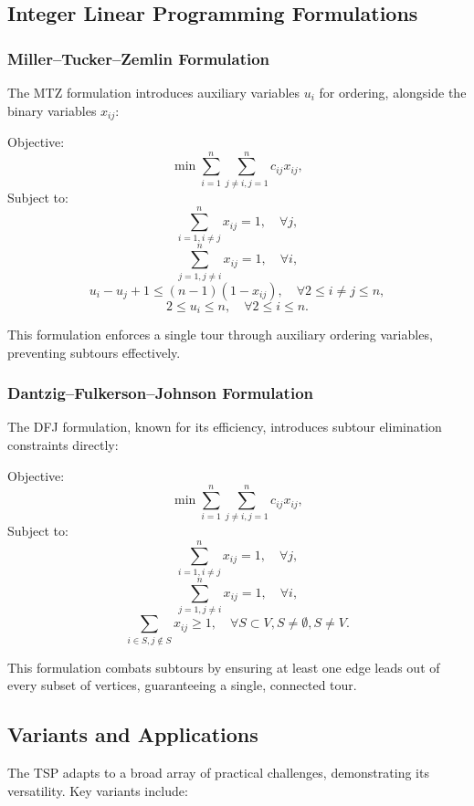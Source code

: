 \subsection{Integer Linear Programming Formulations}

\subsubsection{Miller–Tucker–Zemlin Formulation}

The MTZ formulation introduces auxiliary variables \(u_i\) for ordering, alongside the binary variables \(x_{ij}\):

Objective:
\[
	\min \sum_{i=1}^{n} \sum_{j \ne i, j=1}^{n} c_{ij} x_{ij},
\]
Subject to:
\[
	\sum_{i=1, i \ne j}^{n} x_{ij} = 1, \quad \forall j,
\]
\[
	\sum_{j=1, j \ne i}^{n} x_{ij} = 1, \quad \forall i,
\]
\[
	u_i - u_j + 1 \le (n-1)(1 - x_{ij}), \quad \forall 2 \le i \ne j \le n,
\]
\[
	2 \le u_i \le n, \quad \forall 2 \le i \le n.
\]

This formulation enforces a single tour through auxiliary ordering variables, preventing subtours effectively.

\subsubsection{Dantzig–Fulkerson–Johnson Formulation}

The DFJ formulation, known for its efficiency, introduces subtour elimination constraints directly:

Objective:
\[
	\min \sum_{i=1}^{n} \sum_{j \ne i, j=1}^{n} c_{ij} x_{ij},
\]
Subject to:
\[
	\sum_{i=1, i \ne j}^{n} x_{ij} = 1, \quad \forall j,
\]
\[
	\sum_{j=1, j \ne i}^{n} x_{ij} = 1, \quad \forall i,
\]
\[
	\sum_{i \in S, j \notin S} x_{ij} \ge 1, \quad \forall S \subset V, S \ne \emptyset, S \ne V.
\]

This formulation combats subtours by ensuring at least one edge leads out of every subset of vertices, guaranteeing a single, connected tour.

\subsection{Variants and Applications}

The TSP adapts to a broad array of practical challenges, demonstrating its versatility. Key variants include:

